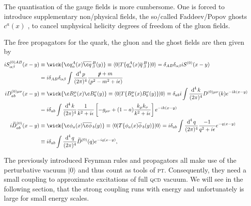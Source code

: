 \documentclass[../../index.tex]{subfiles}
\begin{document}
The quantisation of the gauge fields is more cumbersome. One is forced to
introduce supplementary non\-/physical fields, the so\-/called Faddeev\-/Popov
ghosts \(c^a(x)\) \cite{Faddeev1967}, to cancel unphysical helicity degrees of
freedom of the gluon fields.

The free propagators for the quark, the gluon and the ghost fields are then
given by
\begin{equation}
  \begin{split}
    i S^{(0)AB}_{\alpha\beta}(x-y) &\equiv \wick{ \c q_\alpha^A(x) \anti{\c
        q}_\beta^B(y)} \equiv \langle 0 \vert T \{ q_\alpha^A(x)
    \anti{q}_\beta^B \} \vert 0 \rangle
    = \delta_{AB} \delta_{\alpha\beta} i S^{(0)}(x-y) \\
    &= i \delta_{AB}\delta_{\alpha\beta}\int \fdif{p} \frac{\slashed p + m}{(p^2 - m^2 + i\epsilon)}\\
    i D^{(0)\mu\nu}_{ab}(x-y) &\equiv \wick{ \c B_a^\mu(x) \c B_b^\nu(y)} \equiv
    \langle 0 \vert T \{ B_a^\mu(x) B_b^\nu(y) \} \vert 0 \rangle
    \equiv \delta_{ab}i \int \fdif{k} D^{(0)\mu\nu}(k) e^{-ik(x-y)} \\
    &= i \delta_{ab} \int \fdif{k} \frac{1}{k^2+i\epsilon} \left[ -g_{\mu\nu} + (1-a) \frac{k_\mu k_\nu}{k^2+i\epsilon} \right] e^{-ik(x-y)} \\
    i \widetilde{D}_{ab}^{(0)}(x-y) & \equiv \wick{\c \phi_a(x) \anti{\c
        \phi}_b(y)} \equiv \langle 0 \vert T\{ \phi_a(x) \anti{\phi}_b(y) \}
    \vert 0 \rangle
    = i \delta_{ab} \int \fdif{q} \frac{-1}{q^2 + i\epsilon} e^{-q(x-y)} \\
    &\equiv i \delta_{ab} \int \fdif{q} \widetilde{D}^{(0)}(q) e^{-iq(x-y)},
  \end{split}
\end{equation}

The previously introduced Feynman rules and propagators all make use of the
perturbative vacuum \(\vert 0 \rangle\) and thus count as tools of \textsc{pt}.
Consequently, they need a small coupling to approximate excitations of full
\textsc{qcd} vacuum. We will see in the following section, that the strong
coupling runs with energy and unfortunately is large for small energy scales.
\end{document}
